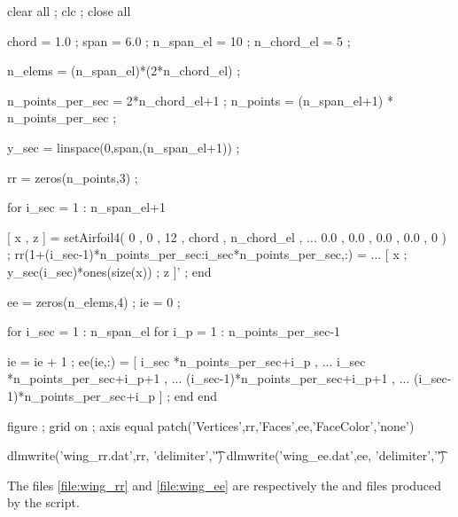 \begin{inputfile}[frame=single, caption={\opt{wing.m}}, label={file:wing_m}]
%
clear all ; clc ; close all

chord      = 1.0 ;
span       = 6.0 ;
n_span_el  = 10  ;
n_chord_el = 5   ; %

n_elems = (n_span_el)*(2*n_chord_el) ;

n_points_per_sec = 2*n_chord_el+1 ;
n_points         = (n_span_el+1) * n_points_per_sec ;

y_sec = linspace(0,span,(n_span_el+1)) ;

rr = zeros(n_points,3) ;

for i_sec = 1 : n_span_el+1

  [ x , z ] = setAirfoil4( 0 , 0 , 12 , chord , n_chord_el , ...
                           0.0 , 0.0 , 0.0 , 0.0 , 0 ) ; 
  rr(1+(i_sec-1)*n_points_per_sec:i_sec*n_points_per_sec,:) = ...
                                 [ x ; y_sec(i_sec)*ones(size(x)) ; z ]' ;
end

ee = zeros(n_elems,4) ; ie = 0 ;

for i_sec = 1 : n_span_el
  for i_p = 1 : n_points_per_sec-1

    ie = ie + 1 ;
    ee(ie,:) = [ i_sec   *n_points_per_sec+i_p   , ...
                 i_sec   *n_points_per_sec+i_p+1 , ...
                (i_sec-1)*n_points_per_sec+i_p+1 , ...
                (i_sec-1)*n_points_per_sec+i_p   ] ;
  end
end

figure ; grid on ; axis equal
patch('Vertices',rr,'Faces',ee,'FaceColor','none')

dlmwrite('wing_rr.dat',rr, 'delimiter','\t')
dlmwrite('wing_ee.dat',ee, 'delimiter','\t')

\end{inputfile}
The files \ref{file:wing_rr} and \ref{file:wing_ee} are respectively the  and  files produced by the  script.

